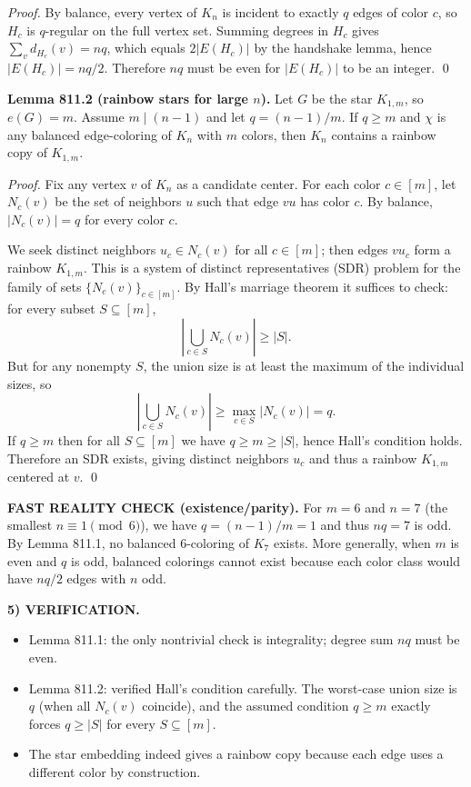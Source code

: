 \emph{Proof.}
By balance, every vertex of $K_n$ is incident to exactly $q$ edges of color $c$, so $H_c$ is $q$-regular on the full vertex set.
Summing degrees in $H_c$ gives $\sum_{v} d_{H_c}(v)=nq$, which equals $2|E(H_c)|$ by the handshake lemma, hence $|E(H_c)|=nq/2$. Therefore $nq$ must be even for $|E(H_c)|$ to be an integer.
\qed

\textbf{Lemma 811.2 (rainbow stars for large $n$).}
Let $G$ be the star $K_{1,m}$, so $e(G)=m$.
Assume $m\mid (n-1)$ and let $q=(n-1)/m$.
If $q\ge m$ and $\chi$ is any balanced edge-coloring of $K_n$ with $m$ colors, then $K_n$ contains a rainbow copy of $K_{1,m}$.

\emph{Proof.}
Fix any vertex $v$ of $K_n$ as a candidate center.
For each color $c\in[m]$, let $N_c(v)$ be the set of neighbors $u$ such that edge $vu$ has color $c$.
By balance, $|N_c(v)|=q$ for every color $c$.

We seek distinct neighbors $u_c\in N_c(v)$ for all $c\in[m]$; then edges $vu_c$ form a rainbow $K_{1,m}$.
This is a system of distinct representatives (SDR) problem for the family of sets $\{N_c(v)\}_{c\in[m]}$.
By Hall's marriage theorem it suffices to check: for every subset $S\subseteq [m]$,
\[
\left|\bigcup_{c\in S} N_c(v)\right|\ge |S|.
\]
But for any nonempty $S$, the union size is at least the maximum of the individual sizes, so
\[
\left|\bigcup_{c\in S} N_c(v)\right|\ge \max_{c\in S}|N_c(v)|=q.
\]
If $q\ge m$ then for all $S\subseteq [m]$ we have $q\ge m\ge |S|$, hence Hall's condition holds.
Therefore an SDR exists, giving distinct neighbors $u_c$ and thus a rainbow $K_{1,m}$ centered at $v$.
\qed

\textbf{FAST REALITY CHECK (existence/parity).}
For $m=6$ and $n=7$ (the smallest $n\equiv 1\pmod 6$), we have $q=(n-1)/m=1$ and thus $nq=7$ is odd.
By Lemma 811.1, no balanced $6$-coloring of $K_7$ exists.
More generally, when $m$ is even and $q$ is odd, balanced colorings cannot exist because each color class would have $nq/2$ edges with $n$ odd.

\medskip
\noindent\textbf{5) VERIFICATION.}

\begin{itemize}
\item Lemma 811.1: the only nontrivial check is integrality; degree sum $nq$ must be even.
\item Lemma 811.2: verified Hall's condition carefully. The worst-case union size is $q$ (when all $N_c(v)$ coincide), and the assumed condition $q\ge m$ exactly forces $q\ge |S|$ for every $S\subseteq[m]$.
\item The star embedding indeed gives a rainbow copy because each edge uses a different color by construction.
\end{itemize}


